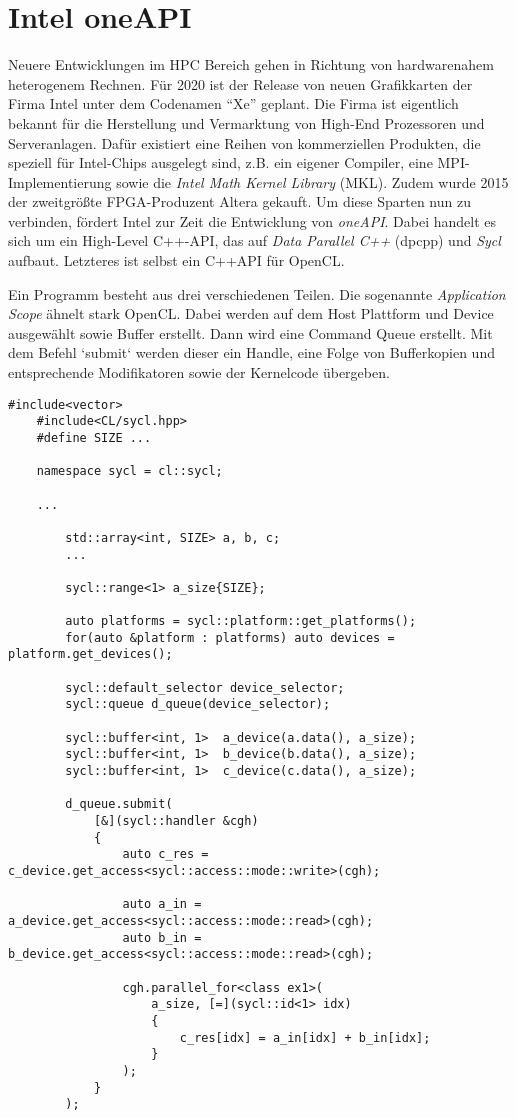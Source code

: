 	\chapter{Intel oneAPI}
	Neuere Entwicklungen im HPC Bereich gehen in Richtung von hardwarenahem heterogenem Rechnen. Für 2020 ist der Release von neuen Grafikkarten der Firma Intel unter dem Codenamen \enquote{Xe} geplant. Die Firma ist eigentlich bekannt für die Herstellung und Vermarktung von High-End Prozessoren und Serveranlagen. Dafür existiert eine Reihen von kommerziellen Produkten, die speziell für Intel-Chips ausgelegt sind, z.B. ein eigener Compiler, eine MPI-Implementierung sowie die \textit{Intel Math Kernel Library} (MKL). Zudem wurde 2015 der zweitgrößte FPGA-Produzent Altera gekauft. Um diese Sparten nun zu verbinden, fördert Intel zur Zeit die Entwicklung von \textit{oneAPI}. Dabei handelt es sich um ein High-Level C++-\Gls{API}, das auf \textit{Data Parallel C++} (dpcpp) und \textit{Sycl} aufbaut. Letzteres ist selbst ein C++\Gls{API} für OpenCL.
	
	Ein Programm besteht aus drei verschiedenen Teilen. Die sogenannte \textit{Application Scope} ähnelt stark OpenCL. Dabei werden auf dem Host Plattform und Device ausgewählt sowie Buffer erstellt. Dann wird eine \Gls{Command Queue} erstellt. Mit dem Befehl \li`submit` werden dieser ein \Gls{Handle}, eine Folge von Bufferkopien und entsprechende Modifikatoren sowie der \Gls{Kernel}code übergeben.
	
	\begin{lstlisting}[caption=oneAPI]
	#include<vector>
	#include<CL/sycl.hpp>
	#define SIZE ...

	namespace sycl = cl::sycl;
	
	...

		std::array<int, SIZE> a, b, c;
		...
	
		sycl::range<1> a_size{SIZE};
		
		auto platforms = sycl::platform::get_platforms();
		for(auto &platform : platforms) auto devices = platform.get_devices();
		
		sycl::default_selector device_selector;
		sycl::queue d_queue(device_selector);
		
		sycl::buffer<int, 1>  a_device(a.data(), a_size);
		sycl::buffer<int, 1>  b_device(b.data(), a_size);
		sycl::buffer<int, 1>  c_device(c.data(), a_size);
		
		d_queue.submit(
			[&](sycl::handler &cgh) 
			{
				auto c_res = c_device.get_access<sycl::access::mode::write>(cgh);

				auto a_in = a_device.get_access<sycl::access::mode::read>(cgh);
				auto b_in = b_device.get_access<sycl::access::mode::read>(cgh);

				cgh.parallel_for<class ex1>(
					a_size, [=](sycl::id<1> idx) 
					{
						c_res[idx] = a_in[idx] + b_in[idx];
					}
				);
			}
		);
		\end{lstlisting}

